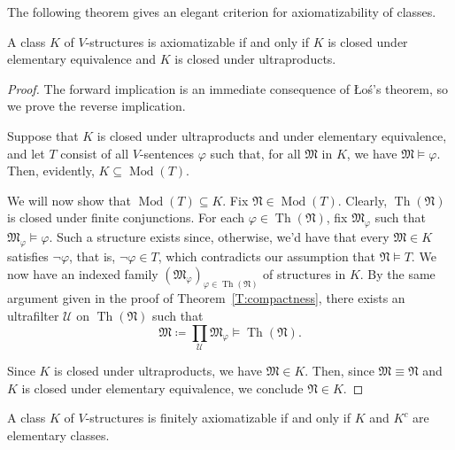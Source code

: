 \documentclass{scrartcl}
\DeclareMathOperator{\Mod}{Mod}
\DeclareMathOperator{\Th}{Th}
\renewcommand{\phi}{\varphi}
\newcommand{\FM}{\mathfrak{M}}
\newcommand{\FN}{\mathfrak{N}}
\newcommand{\SU}{\mathscr{U}}
\begin{document}
 
 The following theorem gives an elegant criterion for axiomatizability of classes.

\begin{theorem}
\label{T:elementary class}
A class $K$ of $V$-structures is axiomatizable if and only if $K$ is closed under elementary equivalence and $K$ is closed under ultraproducts.
\end{theorem}

\begin{proof}
The forward implication is an immediate consequence of Łoś's theorem, so we prove the reverse implication.

Suppose that $K$ is closed under ultraproducts and under elementary equivalence, and let $T$ consist of all $V$-sentences $\phi$ such that, for all $\FM$ in $K$, we have $\FM \models \phi$. Then, evidently, $K\subseteq\Mod(T)$.

We will now show that $\Mod(T)\subseteq K$. Fix $\FN \in\Mod(T)$. Clearly, $\Th(\FN)$ is closed under finite conjunctions. For each $\phi\in \Th(\FN)$, fix $\FM_\phi$ such that $\FM_\phi \models \phi$. Such a structure exists since, otherwise, we'd have that every $\FM\in K$ satisfies $\neg\phi$, that is, $\neg \phi \in T$, which contradicts our assumption that $\FN\models T$. We now have an indexed family $(\FM_\phi)_{\phi\in \Th(\FN)}$ of structures in $K$. By the same argument given in the proof of Theorem~\ref{T:compactness}, there exists an ultrafilter $\SU$ on $\Th(\FN)$ such that
\[
\FM \coloneqq \prod_\SU \FM_\phi \models \Th(\FN).
\]

Since $K$ is closed under ultraproducts, we have $\FM\in K$. Then, since $\mathfrak{M}\equiv\FN$ and $K$ is closed under elementary equivalence, we conclude $\mathfrak{N}\in K$.
\end{proof}


\begin{lemma}
\label{L:elementary class}
A class $K$ of $V$-structures is  finitely axiomatizable if and only if $K$ and $K^c$ are elementary classes.
\end{lemma}
\end{document}
